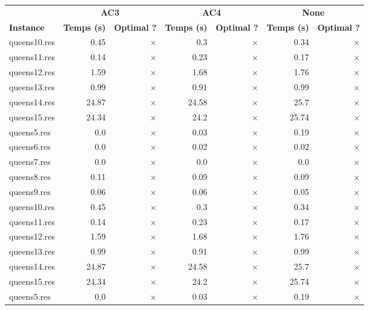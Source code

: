 \documentclass{article}
\begin{document}
\begin{center}
\renewcommand{\arraystretch}{1.4} 
\begin{tabular}{l
rrrrrr}
	\hline
 & \multicolumn{2}{c}{\textbf{AC3}} & \multicolumn{2}{c}{\textbf{AC4}} & \multicolumn{2}{c}{\textbf{None}}\\
\textbf{Instance}  & \textbf{Temps (s)} & \textbf{Optimal ?}  & \textbf{Temps (s)} & \textbf{Optimal ?}  & \textbf{Temps (s)} & \textbf{Optimal ?} \\\hline

queens10.res & 0.45 & 
$\times$
 & 0.3 & 
$\times$
 & 0.34 & 
$\times$
\\
queens11.res & 0.14 & 
$\times$
 & 0.23 & 
$\times$
 & 0.17 & 
$\times$
\\
queens12.res & 1.59 & 
$\times$
 & 1.68 & 
$\times$
 & 1.76 & 
$\times$
\\
queens13.res & 0.99 & 
$\times$
 & 0.91 & 
$\times$
 & 0.99 & 
$\times$
\\
queens14.res & 24.87 & 
$\times$
 & 24.58 & 
$\times$
 & 25.7 & 
$\times$
\\
queens15.res & 24.34 & 
$\times$
 & 24.2 & 
$\times$
 & 25.74 & 
$\times$
\\
queens5.res & 0.0 & 
$\times$
 & 0.03 & 
$\times$
 & 0.19 & 
$\times$
\\
queens6.res & 0.0 & 
$\times$
 & 0.02 & 
$\times$
 & 0.02 & 
$\times$
\\
queens7.res & 0.0 & 
$\times$
 & 0.0 & 
$\times$
 & 0.0 & 
$\times$
\\
queens8.res & 0.11 & 
$\times$
 & 0.09 & 
$\times$
 & 0.09 & 
$\times$
\\
queens9.res & 0.06 & 
$\times$
 & 0.06 & 
$\times$
 & 0.05 & 
$\times$
\\
queens10.res & 0.45 & 
$\times$
 & 0.3 & 
$\times$
 & 0.34 & 
$\times$
\\
queens11.res & 0.14 & 
$\times$
 & 0.23 & 
$\times$
 & 0.17 & 
$\times$
\\
queens12.res & 1.59 & 
$\times$
 & 1.68 & 
$\times$
 & 1.76 & 
$\times$
\\
queens13.res & 0.99 & 
$\times$
 & 0.91 & 
$\times$
 & 0.99 & 
$\times$
\\
queens14.res & 24.87 & 
$\times$
 & 24.58 & 
$\times$
 & 25.7 & 
$\times$
\\
queens15.res & 24.34 & 
$\times$
 & 24.2 & 
$\times$
 & 25.74 & 
$\times$
\\
queens5.res & 0.0 & 
$\times$
 & 0.03 & 
$\times$
 & 0.19 & 
$\times$
\\

\end{tabular}
\end{center}
\end{document}
